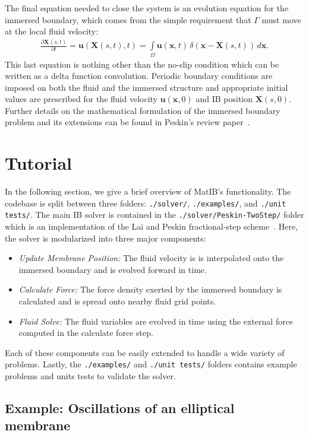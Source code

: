 \documentclass{article}
\newcommand{\mycode}[1]{\texttt{#1}}
\newcommand{\bs}[1]{\boldsymbol{#1}}
\newcommand{\pd}[2]{\frac{\partial #1}{\partial #2}}
\begin{document}
The final equation needed to close the system is an evolution equation
for the immersed boundary, which comes from the simple requirement that
$\Gamma$ must move at the local fluid velocity:
\begin{gather}
  \label{eq:membrane}
  \pd{\bs{X}(s,t)}{t} = \bs{u}(\bs{X}(s,t),t) = \int\limits_\Omega
  \bs{u}(\bs{x},t) \, \delta(\bs{x}-\bs{X}(s,t)) \, d\bs{x}. 
\end{gather}
This last equation is nothing other than the no-slip condition which can 
be written as a delta function convolution.  Periodic boundary conditions are imposed on both
the fluid and the immersed structure and appropriate initial values are
prescribed for the fluid velocity $\bs{u}(\bs{x},0)$ and IB position
$\bs{X}(s,0)$.  Further details on the mathematical formulation of the
immersed boundary problem and its extensions can be
found in Peskin's review paper~\cite{PeskinIB}.

\section{Tutorial}\label{sec:Tutorial}

In the following section, we give a brief overview of MatIB's functionality. The codebase is split
between three folders: \mycode{./solver/}, \mycode{./examples/}, and \mycode{./unit tests/}.
The main IB solver is contained in the \mycode{./solver/Peskin-TwoStep/} folder which 
is an implementation of the Lai and Peskin fractional-step scheme~\cite{PeskinIB}. Here, 
the solver is modularized into three major components:
\begin{itemize}
\item \emph{Update Membrane Position:} The fluid velocity is
  is interpolated onto the immersed boundary and is evolved forward in time.
\item \emph{Calculate Force:} The force density exerted by the
  immersed boundary is calculated and is spread onto nearby fluid grid points.
\item \emph{Fluid Solve:} The fluid variables are evolved in time
  using the external force computed in the calculate force step.
\end{itemize}
Each of these components can be easily extended to handle a wide variety of problems. 
Lastly, the \mycode{./examples/} and \mycode{./unit tests/} folders contains example problems 
and units tests to validate the solver. 

\subsection{Example: Oscillations of an elliptical membrane}\label{sec:EllipticalMembrane}
\end{document}
